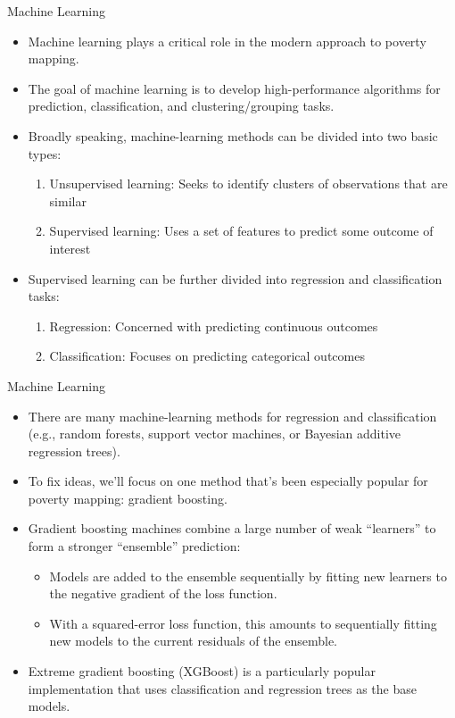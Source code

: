 \documentclass[aspectratio=169, xcolor=dvipsnames]{beamer}
\begin{document}
\begin{frame}{Machine Learning}
\begin{itemize}
\item Machine learning plays a critical role in the modern approach to poverty 
mapping.
\item The goal of machine learning is to develop high-performance algorithms for 
prediction, classification, and clustering/grouping tasks.
\item Broadly speaking, machine-learning methods can be divided into two basic types:
\begin{enumerate}
\item Unsupervised learning: Seeks to identify clusters of observations that are
similar
\item Supervised learning: Uses a set of features to predict some outcome of
interest
\end{enumerate}
\item Supervised learning can be further divided into regression and classification tasks:
\begin{enumerate}
\item Regression: Concerned with predicting continuous outcomes
\item Classification: Focuses on predicting categorical outcomes
\end{enumerate}
\end{itemize}
\end{frame}

\begin{frame}{Machine Learning}
\begin{itemize}
\item There are many machine-learning methods for regression and classification 
(e.g., random forests, support vector machines, or Bayesian additive regression trees).
\item To fix ideas, we'll focus on one method that's been especially popular for poverty
mapping: gradient boosting.
\item Gradient boosting machines combine a large number of weak ``learners'' to form
a stronger ``ensemble'' prediction:
\begin{itemize}
\item Models are added to the ensemble sequentially by fitting new learners to the 
negative gradient of the loss function.
\item With a squared-error loss function, this amounts to sequentially fitting new models
to the current residuals of the ensemble.
\end{itemize}
\item Extreme gradient boosting (XGBoost) is a particularly popular implementation
that uses classification and regression trees as the base models.
\end{itemize}
\end{frame}
\end{document}
